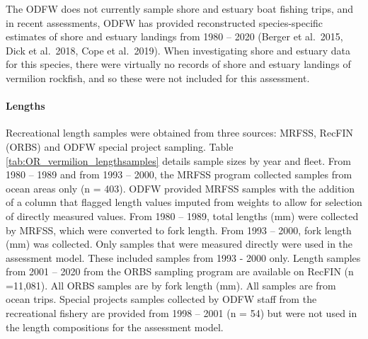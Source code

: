 \documentclass[11pt,
  english,
  a4paper,
]{article}
\begin{document}
\leavevmode\tagmcend\tagstructend


The ODFW does not currently sample shore and estuary boat fishing trips, and in recent assessments, ODFW has provided reconstructed species-specific estimates of shore and estuary landings from 1980 -- 2020 (Berger et al.~2015, Dick et al.~2018, Cope et al.~2019). When investigating shore and estuary data for this species, there were virtually no records of shore and estuary landings of vermilion rockfish, and so these were not included for this assessment.

\leavevmode\tagmcend\tagstructend\par


\hypertarget{lengths-1}{%
\paragraph{Lengths}\label{lengths-1}}

\leavevmode\tagmcend\tagstructend


Recreational length samples were obtained from three sources: MRFSS, RecFIN (ORBS) and ODFW special project sampling. Table \ref{tab:OR_vermilion_lengthsamples} details sample sizes by year and fleet. From 1980 -- 1989 and from 1993 -- 2000, the MRFSS program collected samples from ocean areas only (n = 403). ODFW provided MRFSS samples with the addition of a column that flagged length values imputed from weights to allow for selection of directly measured values. From 1980 -- 1989, total lengths (mm) were collected by MRFSS, which were converted to fork length. From 1993 -- 2000, fork length (mm) was collected. Only samples that were measured directly were used in the assessment model. These included samples from 1993 - 2000 only. Length samples from 2001 -- 2020 from the ORBS sampling program are available on RecFIN (n =11,081). All ORBS samples are by fork length (mm). All samples are from ocean trips. Special projects samples collected by ODFW staff from the recreational fishery are provided from 1998 -- 2001 (n = 54) but were not used in the length compositions for the assessment model.

\leavevmode\tagmcend\tagstructend\par

\end{document}

